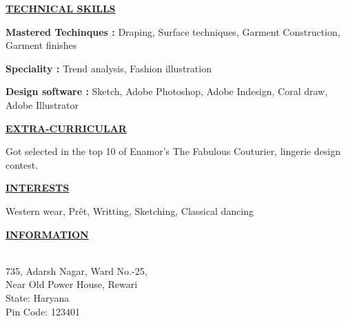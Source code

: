 \documentclass[a4paper]{deedy-resume} %
\begin{document}
\sectionspace
\sectionspace
\sectionspace
\sectionspace

{\uppercase\uline{\textbf{\large{Technical Skills}}\hfill}}
\microspace
\sectionspace

\begin{tightitemize}
\item \textbf{Mastered Techinques \hspace{10pt}:  } Draping, Surface techniques, Garment Construction, Garment finishes
\item \textbf{Speciality \hspace{58pt}: } Trend analysis, Fashion illustration
\item \textbf{Design software \hspace{31pt}: } Sketch, Adobe Photoshop, Adobe Indesign, Coral draw, Adobe Illustrator
\end{tightitemize}
\sectionspace
\sectionspace
\sectionspace
\sectionspace



{\uppercase\uline{\textbf{\large{Extra-Curricular}}\hfill}}

\microspace
\sectionspace

\begin{tightitemize}
\item Got selected in the top 10 of Enamor’s The Fabulous Couturier, lingerie design contest.
\end{tightitemize}

\sectionspace
\sectionspace
\sectionspace
\sectionspace

{\uppercase\uline{\textbf{\large{INTERESTS}}\hfill}}
\microspace
\sectionspace


Western wear, Prêt, Writting, Sketching, Classical dancing
\minispace
\sectionspace
\sectionspace
\sectionspace

{\uppercase\uline{\textbf{\large{Information}}\hfill}}

\microspace
\sectionspace

\\
735, Adarsh Nagar, Ward No.-25, \\
Near Old Power House, Rewari\\
State: Haryana\\
Pin Code: 123401

\sectionspace
\sectionspace
\sectionspace
\end{document}
